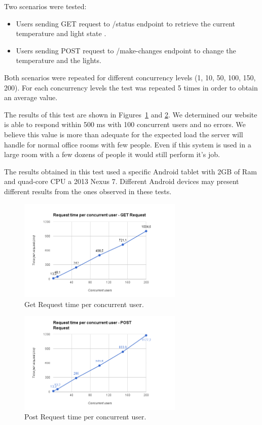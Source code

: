 Two scenarios were tested:
\begin{itemize}
  \item Users sending GET request to /status endpoint to retrieve the current temperature and light state .
  \item Users sending POST request to /make-changes endpoint to change the temperature and the lights.
\end{itemize} 

Both scenarios were repeated for different concurrency levels (1, 10, 50, 100, 150, 200). For each concurrency levels the test was repeated 5 times in order to obtain an average value. 

The results of this test are shown in Figures~\ref{eval:server1} and \ref{eval:server2}. We determined our website is able to respond within 500 ms with 100 concurrent users and no errors. We believe this value is more than adequate for the expected load the server will handle for normal office rooms with few people. Even if this system is used in a large room with a few dozens of people it would still perform it's job.


The results obtained in this test used a specific Android tablet with 2GB of Ram and quad-core CPU a 2013 Nexus 7. Different Android devices may present different results from the ones observed in these tests. 

\begin{figure}[H]
\centering
\includegraphics[width=0.7\textwidth]{Figures/bench_get}
\caption{Get Request time per concurrent user.}
\label{eval:server1}
\end{figure}

\begin{figure}[H]
\centering
\includegraphics[width=0.7\textwidth]{Figures/bench_post}
\caption{Post Request time per concurrent user.}
\label{eval:server2}
\end{figure}





